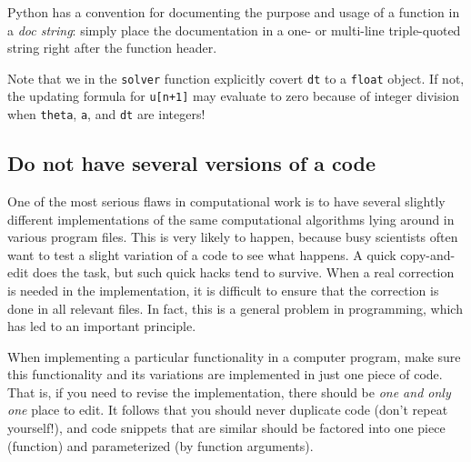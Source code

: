 \documentclass[graybox,sectrefs,envcountresetchap,open=right,final]{svmonodo}
\newenvironment{notice_mdfboxadmon}[1][]{
\begin{notice_mdfboxmdframed}[frametitle=#1]
}
{
\end{notice_mdfboxmdframed}
}
\begin{document}
\begin{notice_mdfboxadmon}
Python has a convention for documenting the purpose and usage of
a function in a \emph{doc string}: simply place the documentation
in a one- or multi-line triple-quoted string right after the
function header.
\end{notice_mdfboxadmon}




\begin{notice_mdfboxadmon}
Note that we in the \texttt{solver} function explicitly covert \texttt{dt} to a
\texttt{float} object. If not, the updating formula for \texttt{u[n+1]} may evaluate
to zero because of integer division when \texttt{theta}, \texttt{a}, and \texttt{dt} are integers!
\end{notice_mdfboxadmon}



\subsection{Do not have several versions of a code}

One of the most serious flaws in computational work is to have several
slightly different implementations of the same computational algorithms
lying around in various program files. This is very likely to happen,
because busy scientists often want to test a slight variation of a code to see
what happens. A quick copy-and-edit does the task, but such quick hacks tend
to survive. When a real correction is needed in the implementation,
it is difficult to ensure that the correction is done in all relevant files.
In fact, this is a general problem in programming, which has led to
an important principle.


\begin{notice_mdfboxadmon}
When implementing a particular functionality in a computer program, make sure
this functionality and its variations are implemented in just one piece
of code. That is, if you need to revise the implementation, there should be
\emph{one and only one} place to edit. It follows that you should never
duplicate code (don't repeat yourself!), and code snippets that are
similar should be factored into one piece (function) and parameterized (by
function arguments).
\end{notice_mdfboxadmon}
\end{document}
